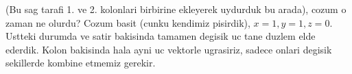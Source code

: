 \documentclass[12pt,fleqn]{article}\usepackage{../common}
\begin{document}
(Bu sag tarafi 1. ve 2. kolonlari birbirine ekleyerek uydurduk bu arada),
cozum o zaman ne olurdu? Cozum basit (cunku kendimiz pisirdik),
$x=1,y=1,z=0$. Ustteki durumda ve satir bakisinda tamamen degisik uc tane
duzlem elde ederdik. Kolon bakisinda hala ayni uc vektorle ugrasiriz,
sadece onlari degisik sekillerde kombine etmemiz gerekir. 
\end{document}
